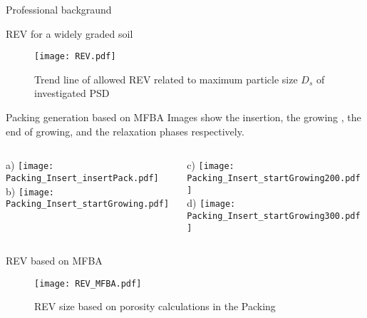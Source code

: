 \documentclass[10pt,xcolor=dvipsnames]{beamer}
\begin{document}
{\begin{frame}{Professional backgraund}
{
\usenavigationsymbolstemplate{}

\begin{frame}{REV for a widely graded soil}
\begin{figure}[H]
   \centering
\texttt{[image: REV.pdf]} 
        \caption{Trend line of allowed REV related to maximum particle size $D_{s}$ of investigated PSD}
        \label{fig:Trendline_REV}
\end{figure}
\end{frame}
}
{
\usenavigationsymbolstemplate{}

%
%
\begin{frame}{Packing generation based on MFBA}
Images show the insertion, the growing , the end of growing, and the relaxation phases respectively.
\vspace{0.2cm}
\begin{columns}
\begin{column}{.49\textwidth}
\centering
\hspace{0.2cm} a) \texttt{[image: Packing\_Insert\_insertPack.pdf]}\\
\hspace{0.2cm} b) \texttt{[image: Packing\_Insert\_startGrowing.pdf]}
\end{column}%
\hfill%
\begin{column}{.49\textwidth}
\centering
c) \texttt{[image: Packing\_Insert\_startGrowing200.pdf]}\\
d) \texttt{[image: Packing\_Insert\_startGrowing300.pdf]}
\end{column}%
\end{columns}

\end{frame}
}


{
\usenavigationsymbolstemplate{}

%
%
\begin{frame}{REV based on MFBA}
\begin{figure}[H]
	\centering
	\texttt{[image: REV\_MFBA.pdf]} 
     \caption{REV size based on porosity calculations in the Packing}
        \label{REV_MFBA}
\end{figure} 

\end{frame}
}



\end{frame}}
\end{document}
